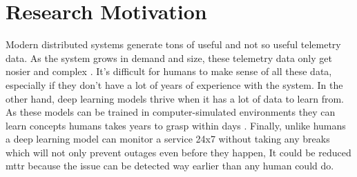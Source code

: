\section{Research Motivation}

Modern distributed systems generate tons of useful and not so useful telemetry data. As the system grows in demand and size, these telemetry data only get nosier and complex \citep{Untangli35:online}. It's difficult for humans to make sense of all these data, especially if they don't have a lot of years of experience with the system. In the other hand, deep learning models thrive when it has a lot of data to learn from. As these models can be trained in computer-simulated environments they can learn concepts humans takes years to grasp within days \citep{OpenAI_dota, silver2017mastering}. Finally, unlike humans a deep learning model can monitor a service 24x7 without taking any breaks which will not only prevent outages even before they happen, It could be reduced \ac{mttr} because the issue can be detected way earlier than any human could do. 